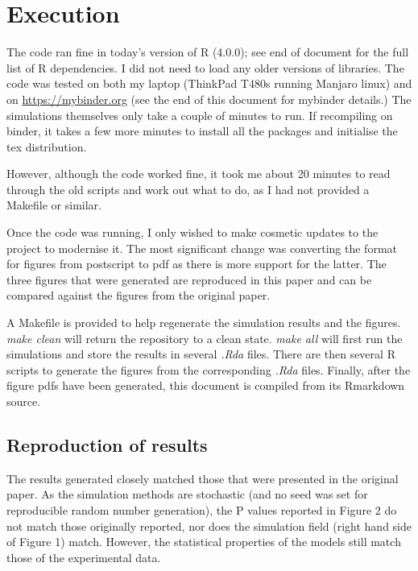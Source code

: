 \hypertarget{execution}{%
\section{Execution}\label{execution}}

The code ran fine in today's version of R (4.0.0); see end of document
for the full list of R dependencies. I did not need to load any older
versions of libraries. The code was tested on both my laptop (ThinkPad
T480s running Manjaro linux) and on \url{https://mybinder.org} (see the
end of this document for mybinder details.) The simulations themselves
only take a couple of minutes to run. If recompiling on binder, it takes
a few more minutes to install all the packages and initialise the tex
distribution.

However, although the code worked fine, it took me about 20 minutes to
read through the old scripts and work out what to do, as I had not
provided a Makefile or similar.

Once the code was running, I only wished to make cosmetic updates to the
project to modernise it. The most significant change was converting the
format for figures from postscript to pdf as there is more support for
the latter. The three figures that were generated are reproduced in this
paper and can be compared against the figures from the original paper.

A Makefile is provided to help regenerate the simulation results and the
figures. \emph{make clean} will return the repository to a clean state.
\emph{make all} will first run the simulations and store the results in
several \emph{.Rda} files. There are then several R scripts to generate
the figures from the corresponding \emph{.Rda} files. Finally, after the
figure pdfs have been generated, this document is compiled from its
Rmarkdown source.

\hypertarget{reproduction-of-results}{%
\subsection{Reproduction of results}\label{reproduction-of-results}}

The results generated closely matched those that were presented in the
original paper. As the simulation methods are stochastic (and no seed
was set for reproducible random number generation), the P values
reported in Figure 2 do not match those originally reported, nor does
the simulation field (right hand side of Figure 1) match. However, the
statistical properties of the models still match those of the
experimental data.

